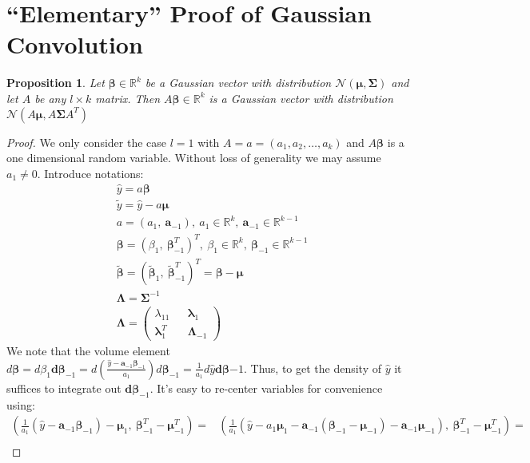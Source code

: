 \documentclass[10pt,fleqn]{amsart}
\newtheorem{proposition}[theorem]{Proposition}
\theoremstyle{definition}
\theoremstyle{remark}
\numberwithin{equation}{section}
\newcommand{\aaa}{\boldsymbol{a}}
\newcommand{\RR}{\mathbb{R}}
\newcommand{\bbeta}{\boldsymbol{\beta}}
\newcommand{\mmu}{\boldsymbol{\mu}}
\newcommand{\SSigma}{\boldsymbol{\Sigma}}
\newcommand{\llambda}{\boldsymbol{\lambda}}
\newcommand{\LLambda}{\boldsymbol{\Lambda}}
\newcommand{\bbetatilde}{\widetilde{\bbeta}}
\newcommand{\yhat}{\widehat{y}}
\newcommand{\ytilde}{\widetilde{y}}
\begin{document}
\appendix\section{``Elementary'' Proof of Gaussian Convolution}\label{appendix_gauss_conv}
\begin{proposition}
    Let $\bbeta\in\RR^k$ be a Gaussian vector with distribution $\mathcal{N}(\mmu,\SSigma)$ and let $A$ be any $l\times k$ matrix.
    Then $A\bbeta\in\RR^k$ is a Gaussian vector with distribution $\mathcal{N}(A\mmu,A\SSigma A^T)$
\end{proposition}
\begin{proof} We only consider the case $l=1$ with $A=a=(a_1, a_2,\ldots, a_k)$ and $A\bbeta$ is a one dimensional random variable.
Without loss of generality we may assume $a_1\neq 0$. Introduce notations:
\begin{align}
    &\yhat = a\bbeta\\
    &\ytilde=\yhat-a\mmu\\
    &a = \left(a_1,\ \aaa_{-1}\right),\ a_1\in\RR^k,\ \aaa_{-1}\in\RR^{k-1}\\
    &\bbeta = \left(\beta_1,\ \bbeta_{-1}^T\right)^T,\ \beta_1\in\RR^k,\ \bbeta_{-1}\in\RR^{k-1}\\
    &\bbetatilde=\left(\bbetatilde_1,\ \bbetatilde_{-1}^T\right)^T=\bbeta-\mmu\\
    &\LLambda=\SSigma^{-1}\\
    &\LLambda=\left(\begin{matrix}
        \lambda_{11} && \llambda_1\\
        \llambda_1^T && \LLambda_{-1}
    \end{matrix}\right)
\end{align}
We note that the volume element
$\displaystyle d\bbeta=d\beta_1\boldsymbol{d}\bbeta_{-1}=d\left(\frac{\yhat-\aaa_{-1}\bbeta_{-1}}{a_1}\right)d\bbeta_{-1}=\frac 1{a_1}d\yhat\boldsymbol{d}\bbeta{-1}$.
Thus, to get the density of $\yhat$ it suffices to integrate out $\boldsymbol{d}\bbeta_{-1}$. It's easy to re-center variables for convenience using:
\begin{equation*}\begin{split}
    \left(\frac{1}{a_1}\left(\yhat-\aaa_{-1}\bbeta_{-1}\right)-\mmu_1,\ \bbeta_{-1}^T-\mmu_{-1}^T\right)=&\left(\frac{1}{a_1}\left(\yhat-a_1\mmu_1-\aaa_{-1}\left(\bbeta_{-1}-\mmu_{-1}\right)-\aaa_{-1}\mmu_{-1}\right),\ \bbeta_{-1}^T-\mmu_{-1}^T\right)=\\

\end{split}
\end{equation*}
\end{proof}
\end{document}

